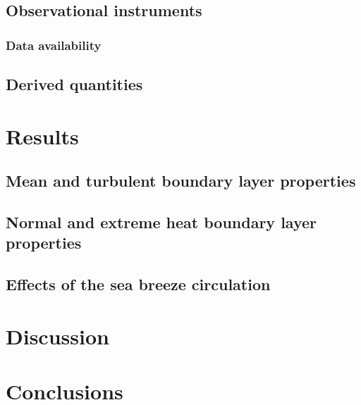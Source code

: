 \documentclass[11pt,a4paper]{article}
\begin{document}
\subsection{Observational instruments}

\subsubsection{Data availability}

\subsection{Derived quantities}

\section{Results}

\subsection{Mean and turbulent boundary layer properties}

\subsection{Normal and extreme heat boundary layer properties}

\subsection{Effects of the sea breeze circulation}

\section{Discussion}

\section{Conclusions}

\printbibliography
\end{document}
